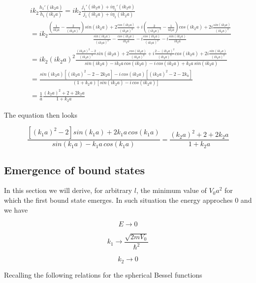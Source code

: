 \documentclass{article}
\begin{document}
\begin{align}
& ik_2 \frac{h_1'(ik_2a)}{h_1(ik_2a)} = ik_2 \frac{j_1'(ik_2a) + i \eta_1'(ik_2a)}{j_1(ik_2a) + i \eta_1(ik_2a)} \nonumber \\
& = ik_2 \frac{\left( \frac{1}{ik_2a} - \frac{2}{(ik_2a)^3} \right) sin(ik_2a) + 2 \frac{cos(ik_2a)}{(ik_2a)^2} + i \left( \frac{2}{(ik_2a)^3} - \frac{1}{ik_2a} \right) cos(ik_2a) + 2i \frac{sin(ik_2a)}{(ik_2a)^2}}{\frac{sin(ik_2a)}{(ik_2a)^2} - \frac{cos(ik_2a)}{ik_2a} - i \frac{cos(ik_2a)}{(ik_2a)^2} - i \frac{sin(ik_2a)}{ik_2a}} \nonumber \\
& = ik_2(ik_2a)^2 \frac{\frac{(ik_2a)^2-2}{(ik_2a)^3}sin(ik_2a) + 2 \frac{cos(ik_2a)}{(ik_2a)^2}+i \frac{2-(ik_2a)^2}{(ik_2a)^3}cos(ik_2a)+2i \frac{sin(ik_2a)}{(ik_2a)^2}}{sin(ik_2a) - ik_2a \, cos(ik_2a) -i \, cos(ik_2a) + k_2a \, sin(ik_2a)} \nonumber \\
& = \frac{sin(ik_2a) \left[(ik_2a)^2 - 2 - 2k_2a \right] - i \, cos(ik_2a) \left[ (ik_2a)^2 -2 - 2k_a \right]}{(1+k_2a) \left[ sin(ik_2a) - i \, cos(ik_2a) \right]} \nonumber \\
& = \frac{1}{a} \frac{(k_2a)^2 + 2 + 2k_2a}{1+k_2a}
\end{align}

The equation then looks

\begin{equation}
\frac{\left[ (k_1a)^2 - 2 \right] sin(k_1a) + 2k_1a \, cos(k_1a)}{sin(k_1a) - k_1a \, cos(k_1a)} = \frac{(k_2a)^2 + 2 + 2k_2a}{1+k_2a}
\end{equation}

\subsection{Emergence of bound states}
In this section we will derive, for arbitrary \( l \), the minimum value of \( V_0a^2 \) for which the first bound state emerges. In such situation the energy approches 0 and we have

\begin{equation}
E \rightarrow 0
\end{equation}

\begin{equation}
k_1 \rightarrow \frac{\sqrt{2mV_0}}{\hbar^2}
\end{equation}

\begin{equation}
k_2 \rightarrow 0
\end{equation}

Recalling the following relations for the spherical Bessel functions
\end{document}
